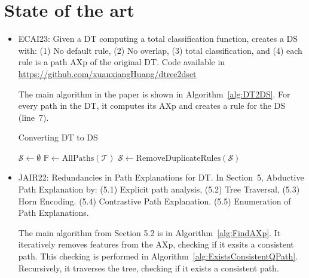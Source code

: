
\section{State of the art}

\begin{itemize}
    \item ECAI23: \cite{HuangMS23} Given a DT computing a total classification function, creates a DS with: (1) No default rule, (2) No overlap, (3) total classification, and (4) each rule is a path AXp of the original DT.
Code available in \url{https://github.com/xuanxiangHuang/dtree2dset}

The main algorithm in the paper is shown in Algorithm~\ref{alg:DT2DS}.
For every path in the DT, it computes its AXp and creates a rule for the DS (line~7).

\begin{algorithm}
    \caption{Converting DT to DS}
    \label{alg:DT2DS}
    
    
    $\mathcal{S} \leftarrow \emptyset$\;
    $\mathbb{P} \leftarrow \text{AllPaths}(\mathcal{T})$\;
    $\mathcal{S} \leftarrow \text{RemoveDuplicateRules}(\mathcal{S})$\;
\end{algorithm}

    \item JAIR22: \cite{izza-jair-22} Redundancies in Path Explanations for DT. In Section~5, Abductive Path Explanation by: (5.1) Explicit path analysis, (5.2) Tree Traversal, (5.3) Horn Encoding.
(5.4) Contrastive Path Explanation.
(5.5) Enumeration of Path Explanations.

The main algorithm from Section 5.2 is in Algorithm~\ref{alg:FindAXp}.
It iteratively removes features from the AXp, checking if it exsits a consistent path.
This checking is performed in Algorithm~\ref{alg:ExistsConsistentQPath}.
Recursively, it traverses the tree, checking if it exists a consistent path.


\end{itemize}

